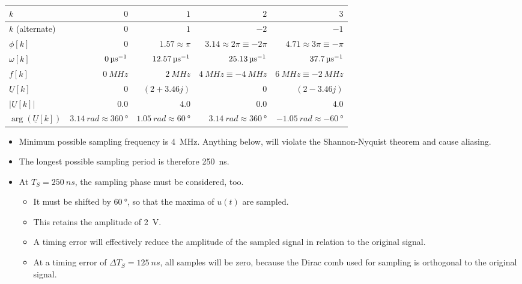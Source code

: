 \begin{solution}
\begin{tasks}
		\begin{table}[H]
			\centering
			\begin{tabular}{|l|r|r|r|r|}
				\hline
				$k$ & $0$ & $1$ & $2$ & $3$
\\
				\hline
				$k$ (alternate) & $0$ & $1$ & $-2$ & $-1$ \\
				\hline
				\hline
				$\phi[k]$ & $0$ & $1.57 \approx \pi$ & $3.14 \approx 2 \pi \equiv -2\pi$ & $4.71 \approx 3 \pi \equiv -\pi$ \\
				\hline
				$\omega[k]$ & $\SI{0}{{\micro\second}^{-1}}$ & $\SI{12.57}{{\micro\second}^{-1}}$ & $\SI{25.13}{{\micro\second}^{-1}}$ & $\SI{37.7}{{\micro\second}^{-1}}$ \\
				\hline
				$f[k]$ & $\SI{0}{MHz}$ & $\SI{2}{MHz}$ & $\SI{4}{MHz} \equiv \SI{-4}{MHz}$ & $\SI{6}{MHz} \equiv \SI{-2}{MHz}$ \\
				\hline
				\hline
				$\underline{U}[k]$ & $0$ & $(2+3.46j)$ & $0$ & $(2-3.46j)$ \\
				\hline
				$|\underline{U}[k]|$ & $0.0$ & $4.0$ & $0.0$ & $4.0$ \\
				\hline
				$\arg\left(\underline{U}[k]\right)$ & $\SI{3.14}{rad} \approx \SI{360}{\degree}$ & $\SI{1.05}{rad} \approx \SI{60}{\degree}$ & $\SI{3.14}{rad} \approx \SI{360}{\degree}$ & $\SI{-1.05}{rad} \approx \SI{-60}{\degree}$ \\
				\hline
			\end{tabular}
		\end{table}
	
		\task
		\begin{itemize}
			\item Minimum possible sampling frequency is \SI{4}{MHz}. Anything below, will violate the Shannon-Nyquist theorem and cause aliasing.
			\item The longest possible sampling period is therefore \SI{250}{ns}.
			\item At $T_S = \SI{250}{ns}$, the sampling phase must be considered, too.
			\begin{itemize}
				\item It must be shifted by $\SI{+60}{\degree}$, so that the maxima of $u(t)$ are sampled.
				\item This retains the amplitude of \SI{2}{V}.
				\item A timing error will effectively reduce the amplitude of the sampled signal in relation to the original signal.
				\item At a timing error of $\Delta T_S = \SI{125}{ns}$, all samples will be zero, because the Dirac comb used for sampling is orthogonal to the original signal.
			\end{itemize}
		\end{itemize}
	

\end{tasks}
\end{solution}
